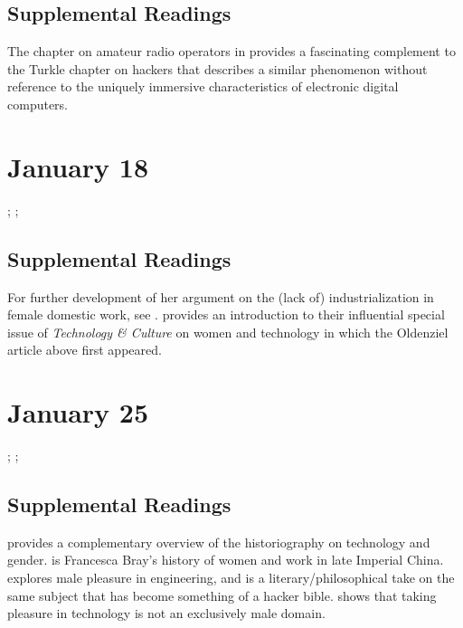 \documentclass[11pt]{article}
\begin{document}


\subsection{Supplemental Readings}

\noindent The chapter on amateur radio operators in \cite{Douglas1987} provides a fascinating complement to the Turkle chapter on hackers that describes a similar phenomenon without reference to the uniquely immersive characteristics of electronic digital computers.  

\section{January 18}

; ; 

\subsection{Supplemental Readings}

For further development of her argument on the (lack of)
industrialization in female domestic work, see \cite{Cowan:1983vm}.
\cite{Lerman:1997ui} provides an introduction to their influential
special issue of \emph{Technology \& Culture} on women and technology in which
the Oldenziel article above first appeared.

\section{January 25}

; ; 

\subsection{Supplemental Readings}

\cite{Wajcman:2000vq} provides a complementary overview of the historiography on technology and gender.  \cite{Bray:1997wl} is Francesca Bray’s history of women and work in late Imperial China.   \cite{Florman:1996um} explores male pleasure in engineering, and \cite{Pirsig:1974vs} is a literary/philosophical take on the same subject that has become something of a hacker bible.   \cite{Ullman:1997vv} shows that taking pleasure in technology is not an exclusively male domain. 
\end{document}

